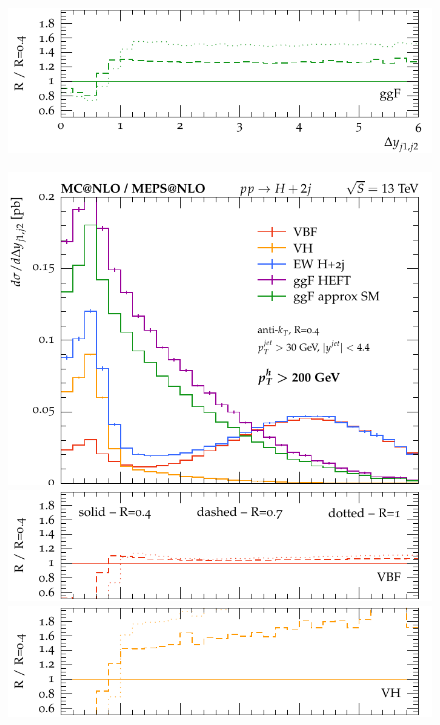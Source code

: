 \documentclass[10pt,prd,fleqn,superscriptaddress,notitlepage,nofootinbib,preprintnumbers,nobalancelastpage]{revtex4-1}
\begin{document}
\begin{figure}[p]
\begin{minipage}{.2925\textwidth}
    \includegraphics[width=\textwidth]{figures/channels/delta_y_jj12_rGGH.pdf}
  \end{minipage}\hfill
  \begin{minipage}{.2925\textwidth}
    \includegraphics[width=\textwidth]{figures/channels/delta_y_jj12_pth200.pdf}
    \includegraphics[width=\textwidth]{figures/channels/delta_y_jj12_pth200_rVBF.pdf}
    \includegraphics[width=\textwidth]{figures/channels/delta_y_jj12_pth200_rVH.pdf}

\end{minipage}
\end{figure}
\end{document}
